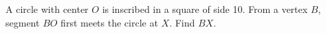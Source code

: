 A circle with center $ O $ is inscribed in a square of side 10. From a vertex $ B $, segment $ BO $ first meets the circle at $ X $. Find $ BX $.
